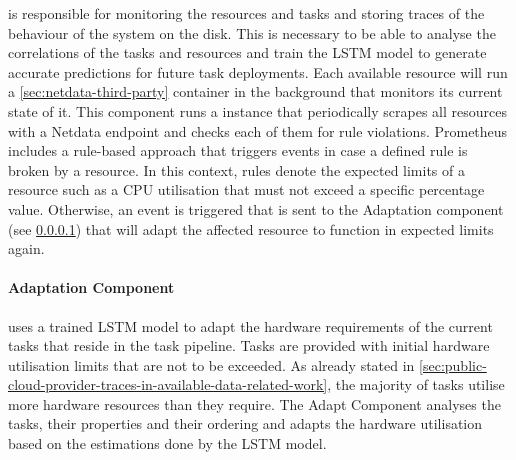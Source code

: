       is responsible for monitoring the resources and tasks and storing traces of the behaviour of the system on the disk.
      This is necessary to be able to analyse the correlations of the tasks and resources and train the LSTM model to generate accurate predictions for future task deployments. Each available resource will run a \ref{sec:netdata-third-party} container in the background that monitors its current state of it. 
      This component runs a  instance that periodically scrapes all resources with a Netdata endpoint and checks each of them for rule violations. Prometheus includes a rule-based approach that triggers events in case a defined rule is broken by a resource.
      In this context, rules denote the expected limits of a resource such as a CPU utilisation that must not exceed a specific percentage value.
      Otherwise, an event is triggered that is sent to the Adaptation component (see \ref{par:adapt-component-saa-background}) that will adapt the affected resource to function in expected limits again.
    
      
      \paragraph{Adaptation Component }
      \label{par:adapt-component-saa-background}
      
      uses a trained LSTM model to adapt the hardware requirements of the current tasks that reside in the task pipeline.
      Tasks are provided with initial hardware utilisation limits that are not to be exceeded. As already stated in \ref{sec:public-cloud-provider-traces-in-available-data-related-work}, the majority of tasks utilise more hardware resources than they require. The Adapt Component analyses the tasks, their properties and their ordering and adapts the hardware utilisation based on the estimations done by the LSTM model.

